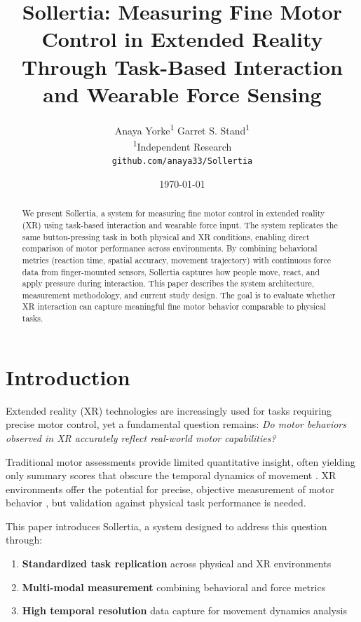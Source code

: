 \documentclass[11pt,twocolumn]{article}
\title{
    \vspace{-1cm}
    \textbf{Sollertia: Measuring Fine Motor Control in Extended Reality Through Task-Based Interaction and Wearable Force Sensing}
}
\author{
    Anaya Yorke\textsuperscript{1} \quad
    Garret S. Stand\textsuperscript{1} \\[0.5em]
    \textsuperscript{1}Independent Research \\[0.3em]
    \small\texttt{github.com/anaya33/Sollertia}
}
\date{\today}
\begin{document}
\maketitle

\begin{abstract}
We present Sollertia, a system for measuring fine motor control in extended reality (XR) using task-based interaction and wearable force input. The system replicates the same button-pressing task in both physical and XR conditions, enabling direct comparison of motor performance across environments. By combining behavioral metrics (reaction time, spatial accuracy, movement trajectory) with continuous force data from finger-mounted sensors, Sollertia captures how people move, react, and apply pressure during interaction. This paper describes the system architecture, measurement methodology, and current study design. The goal is to evaluate whether XR interaction can capture meaningful fine motor behavior comparable to physical tasks.
\end{abstract}

\section{Introduction}

Extended reality (XR) technologies are increasingly used for tasks requiring precise motor control, yet a fundamental question remains: \textit{Do motor behaviors observed in XR accurately reflect real-world motor capabilities?}

Traditional motor assessments provide limited quantitative insight, often yielding only summary scores that obscure the temporal dynamics of movement \citep{schoen2025pegs}. XR environments offer the potential for precise, objective measurement of motor behavior \citep{chen2024metrics}, but validation against physical task performance is needed.

This paper introduces Sollertia, a system designed to address this question through:

\begin{enumerate}
    \item \textbf{Standardized task replication} across physical and XR environments
    \item \textbf{Multi-modal measurement} combining behavioral and force metrics
    \item \textbf{High temporal resolution} data capture for movement dynamics analysis
\end{enumerate}
\end{document}
